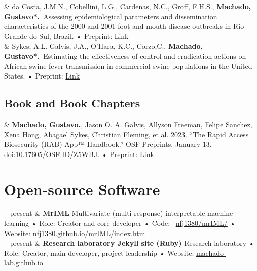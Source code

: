 \documentclass[11pt]{article}
\newcommand{\Preprint}[1]{\newline • Preprint: \faFilePdf}
\newcommand{\GitHub}[1]{\newline • Code: \faGithub\ \href{https://github.com/#1}{#1}}
\newcommand{\Role}[1]{\newline • Role: #1}
\newcommand{\Website}[1]{\newline • Website: \href{https://#1}{#1}}
\newcommand{\Duration}[2]{\fontsize{10pt}{0}\selectfont #1 -- #2}
\newcommand{\Year}[1]{\fontsize{10pt}{0}\selectfont #1}
\newcommand{\Ongoing}{present}
\begin{document}
\begin{EntriesTable}
\Year{2022}  &
da Costa, J.M.N., Cobellini, L.G., Cardenas, N.C., Groff, F.H.S., {\textbf{Machado, Gustavo*.}}\ Assessing epidemiological parameters and dissemination characteristics of the 2000 and 2001 foot-and-mouth disease outbreaks in Rio Grande do Sul, Brazil.
  \Preprint{}\href{https://www.biorxiv.org/content/10.1101/2022.05.22.492961v1?rss=1}{Link}
  \\

\Year{2022}  &
Sykes, A.L. Galvis, J.A., O’Hara, K.C., Corzo,C., {\textbf{Machado, Gustavo*.}}\ Estimating the effectiveness of control and eradication actions on African swine fever transmission in commercial swine populations in the United States.
  \Preprint{}\href{https://doi.org/10.1101/2022.09.04.506538}{Link}
  \\
\end{EntriesTable}

\subsection{Book and Book Chapters}
\begin{EntriesTable}

\Year{2023}  &
  \textbf{Machado, Gustavo.}, Jason O. A. Galvis, Allyson Freeman, Felipe Sanchez, Xena Hong, Abagael Sykes, Christian Fleming, et al. 2023. “The Rapid Access Biosecurity (RAB) App™ Handbook.” OSF Preprints. January 13. doi:10.17605/OSF.IO/Z5WBJ.
  \Preprint{}\href{https://osf.io/p5uwq/}{Link}
  \\

\end{EntriesTable}



\nocite{*}

\printbibliography[title=PEER-REVIEWED]




\section{Open-source Software}

\begin{EntriesTable}
  \Duration{2021}{\Ongoing} &
  \textbf{MrIML}
  \newline
  Multivariate (multi-response) interpretable machine learning
  \Role{Creator and core developer}
  \GitHub{nfj1380/mrIML/}
  \Website{nfj1380.github.io/mrIML/index.html}
  \\
  \Duration{2020}{\Ongoing} &
  \textbf{Research laboratory Jekyll site (Ruby)}
  \newline
  Research laboratory
  \Role{Creator, main developer, project leadership}
  \Website{machado-lab.github.io}
\end{EntriesTable}
\end{document}
